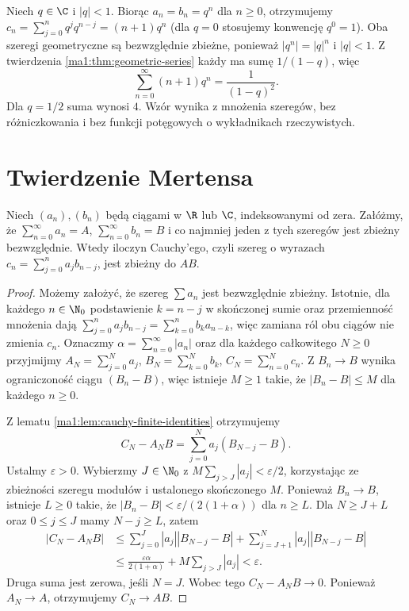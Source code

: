 \begin{przyklad}
\label{ma1:ex:geometric-product}
Niech $q\in\C$ i $|q|<1$. Biorąc $a_n=b_n=q^n$ dla $n\ge0$, otrzymujemy $c_n=\sum_{j=0}^n q^jq^{n-j}=(n+1)q^n$ (dla $q=0$ stosujemy konwencję $q^0=1$). Oba szeregi geometryczne są bezwzględnie zbieżne, ponieważ $|q^n|=|q|^n$ i $|q|<1$. Z twierdzenia \ref{ma1:thm:geometric-series} każdy ma sumę $1/(1-q)$, więc
\[
 \sum_{n=0}^\infty (n+1)q^n=\frac1{(1-q)^2}.
\]
Dla $q=1/2$ suma wynosi $4$. Wzór wynika z mnożenia szeregów, bez różniczkowania i bez funkcji potęgowych o wykładnikach rzeczywistych.
\end{przyklad}

\section{Twierdzenie Mertensa}
\begin{twierdzenie}[Mertensa]
\label{ma1:thm:mertens-product}
Niech $(a_n),(b_n)$ będą ciągami w $\R$ lub $\C$, indeksowanymi od zera. Załóżmy, że $\sum_{n=0}^\infty a_n=A$, $\sum_{n=0}^\infty b_n=B$ i co najmniej jeden z tych szeregów jest zbieżny bezwzględnie. Wtedy iloczyn Cauchy'ego, czyli szereg o wyrazach $c_n=\sum_{j=0}^n a_jb_{n-j}$, jest zbieżny do $AB$.
\end{twierdzenie}
\begin{proof}
Możemy założyć, że szereg $\sum a_n$ jest bezwzględnie zbieżny. Istotnie, dla każdego $n\in\N_0$ podstawienie $k=n-j$ w skończonej sumie oraz przemienność mnożenia dają $\sum_{j=0}^n a_jb_{n-j}=\sum_{k=0}^n b_ka_{n-k}$, więc zamiana ról obu ciągów nie zmienia $c_n$. Oznaczmy $\alpha=\sum_{n=0}^\infty|a_n|$ oraz dla każdego całkowitego $N\ge0$ przyjmijmy $A_N=\sum_{j=0}^N a_j$, $B_N=\sum_{k=0}^N b_k$, $C_N=\sum_{n=0}^N c_n$. Z $B_n\to B$ wynika ograniczoność ciągu $(B_n-B)$, więc istnieje $M\ge1$ takie, że $|B_n-B|\le M$ dla każdego $n\ge0$.

Z lematu \ref{ma1:lem:cauchy-finite-identities} otrzymujemy
\[
 C_N-A_N B=\sum_{j=0}^N a_j(B_{N-j}-B).
\]
Ustalmy $\varepsilon>0$. Wybierzmy $J\in\N_0$ z $M\sum_{j>J}|a_j|<\varepsilon/2$, korzystając ze zbieżności szeregu modułów i ustalonego skończonego $M$. Ponieważ $B_n\to B$, istnieje $L\ge0$ takie, że $|B_n-B|<\varepsilon/(2(1+\alpha))$ dla $n\ge L$. Dla $N\ge J+L$ oraz $0\le j\le J$ mamy $N-j\ge L$, zatem
\[
\begin{aligned}
 |C_N-A_N B|
 &\le\sum_{j=0}^J |a_j||B_{N-j}-B|
      +\sum_{j=J+1}^N |a_j||B_{N-j}-B|\\
 &\le\frac{\varepsilon\alpha}{2(1+\alpha)}
        +M\sum_{j>J}|a_j|
 <\varepsilon.
\end{aligned}
\]
Druga suma jest zerowa, jeśli $N=J$. Wobec tego $C_N-A_NB\to0$. Ponieważ $A_N\to A$, otrzymujemy $C_N\to AB$.
\end{proof}

